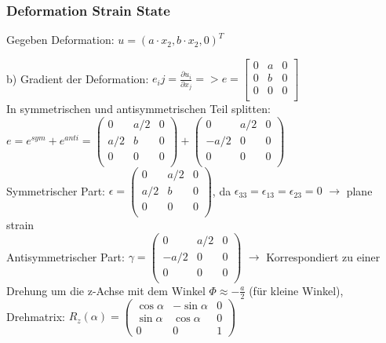 \documentclass[a4paper]{scrartcl}
\begin{document}
\subsubsection{Deformation Strain State}\label{9.3} %
Gegeben Deformation: $u = (a \cdot x_2, b \cdot x_2, 0)^T$

b) Gradient der Deformation: $e_ij= \frac{\partial u_i}{\partial x_j} => e =
\begin{bmatrix}
0 & a & 0\\
0 & b & 0\\
0 & 0 & 0\\
\end{bmatrix}$\\
In symmetrischen und antisymmetrischen Teil splitten: $e = e^{sym} + e^{anti}=
\begin{pmatrix}
0 & a/2 & 0\\
a/2 & b & 0\\
0 & 0 & 0\\
\end{pmatrix}
+
\begin{pmatrix}
0 & a/2 & 0\\
-a/2 & 0 & 0\\
0 & 0 & 0\\
\end{pmatrix}$\\
Symmetrischer Part: $\epsilon = \begin{pmatrix}
0 & a/2 & 0\\
a/2 & b & 0\\
0 & 0 & 0\\
\end{pmatrix}$, da $\epsilon_{33} = \epsilon_{13} = \epsilon_{23}= 0$ $\rightarrow$ plane
strain\\
Antisymmetrischer Part: $\gamma = \begin{pmatrix}
0 & a/2 & 0\\
-a/2 & 0 & 0\\
0 & 0 & 0\\
\end{pmatrix}$ $\rightarrow$ Korrespondiert zu einer Drehung um die z-Achse mit
dem Winkel $\Phi \approx -\frac{a}{2}$ (für kleine Winkel), Drehmatrix:
$R_z(\alpha) = \begin{pmatrix} \cos \alpha & -\sin \alpha & 0 \\
\sin \alpha &  \cos \alpha & 0 \\            
   0        &  0           & 1
\end{pmatrix}$
\end{document}
